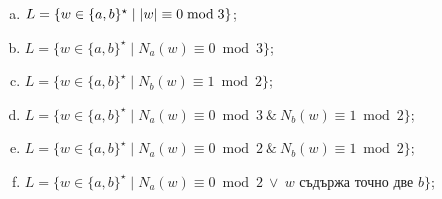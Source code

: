 \begin{problem}
\begin{enumerate}[a)]
  \item
    $L = \{w \in \{a,b\}^\star \mid \lvert{w}\rvert \equiv 0 \bmod 3\}$;
  \item
    $L = \{w \in \{a,b\}^\star \mid N_a(w) \equiv 0 \bmod 3\}$;
  \item
    $L = \{w \in \{a,b\}^\star \mid N_b(w) \equiv 1 \bmod 2\}$;
  \item
    $L = \{w \in \{a,b\}^\star \mid N_a(w) \equiv 0 \bmod 3\ \&\ N_b(w) \equiv 1 \bmod 2\}$;
  \item
    $L = \{w \in \{a,b\}^\star \mid N_a(w) \equiv 0 \bmod 2\ \&\ N_b(w) \equiv 1 \bmod 2\}$;
  \item
    $L = \{w \in \{a,b\}^\star \mid N_a(w) \equiv 0 \bmod 2\ \vee\ w \mbox{ съдържа точно две }b\}$;
  \end{enumerate}
\end{problem}
  
